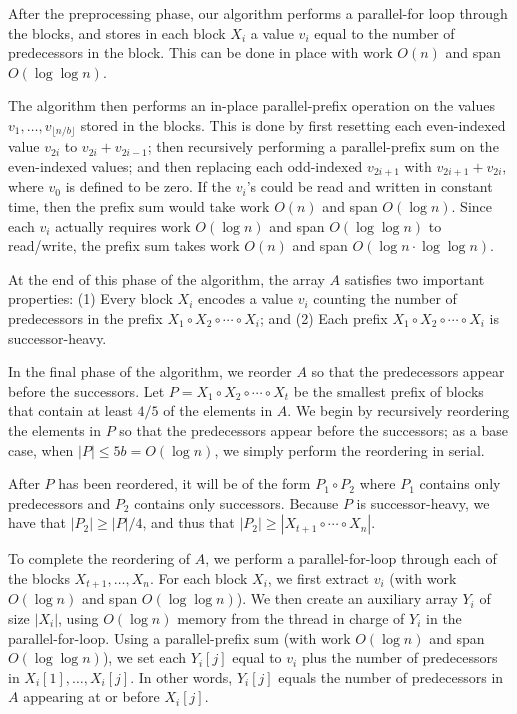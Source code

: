 \documentclass[sigconf]{acmart}
\renewcommand{\paragraph}[1]{\vspace{0.09in}\noindent{\bf \boldmath #1.}}
\theoremstyle{remark}
\theoremstyle{remark}
\begin{document}
After the preprocessing phase, our algorithm performs a parallel-for
loop through the blocks, and stores in each block $X_i$ a value $v_i$
equal to the number of predecessors in the block. This can be done
in place with work $O(n)$ and span $O(\log \log n)$.

The algorithm then performs an in-place parallel-prefix operation on
the values $v_1, \ldots, v_{\lfloor n / b \rfloor}$ stored in the
blocks. This is done by first resetting each even-indexed value
$v_{2i}$ to $v_{2i} + v_{2i - 1}$; then recursively performing a
parallel-prefix sum on the even-indexed values; and then replacing
each odd-indexed $v_{2i + 1}$ with $v_{2i + 1} + v_{2i}$, where $v_0$
is defined to be zero. If the $v_i$'s could be read and written in
constant time, then the prefix sum would take work $O(n)$
and span $O(\log n)$. Since each $v_i$ actually requires work $O(\log
n)$ and span $O(\log \log n)$ to read/write, the prefix sum takes work
$O(n)$ and span $O(\log n \cdot \log \log n)$.

At the end of this phase of the algorithm, the array $A$ satisfies two
important properties: (1) Every block $X_i$ encodes a value $v_i$
counting the number of predecessors in the prefix $X_1 \circ X_2 \circ
\cdots \circ X_i$; and (2) Each prefix $X_1 \circ X_2 \circ \cdots
\circ X_i$ is successor-heavy.

\paragraph{In-Place Reordering} In the final phase of the algorithm, we reorder $A$ so that the predecessors appear before the successors. Let $P = X_1 \circ X_2 \circ \cdots \circ X_t$ be the smallest prefix of blocks that contain at least $4/5$ of the elements in $A$. We begin by recursively reordering the elements in $P$ so that the predecessors appear before the successors; as a base case, when $|P| \le 5b = O(\log n)$, we simply perform the reordering in serial.

After $P$ has been reordered, it will be of the form $P_1
\circ P_2$ where $P_1$ contains only predecessors and $P_2$ contains
only successors. Because $P$ is successor-heavy, we have that $|P_2|
\ge |P| / 4$, and thus that $|P_2| \ge |X_{t + 1} \circ \cdots \circ
X_n|$.

To complete the reordering of $A$, we perform a parallel-for-loop
through each of the blocks $X_{t + 1}, \ldots, X_n$. For each block
$X_i$, we first extract $v_i$ (with work $O(\log n)$ and span $O(\log
\log n)$). We then create an auxiliary array $Y_i$ of size $|X_i|$,
using $O(\log n)$ memory from the thread in charge of $Y_i$ in the
parallel-for-loop. Using a parallel-prefix sum (with work $O(\log n)$
and span $O(\log \log n)$), we set each $Y_i[j]$ equal to $v_i$ plus
the number of predecessors in $X_i[1], \ldots, X_i[j]$. In other
words, $Y_i[j]$ equals the number of predecessors in $A$ appearing at
or before $X_i[j]$.
\end{document}
